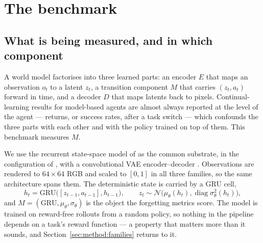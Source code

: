 %
%
%

\section{The benchmark}
\label{sec:method}

\subsection{What is being measured, and in which component}
\label{sec:method:setup}

A world model factorises into three learned parts: an encoder $E$ that maps an
observation $o_t$ to a latent $z_t$, a transition component $M$ that carries
$(z_t, a_t)$ forward in time, and a decoder $D$ that maps latents back to
pixels. Continual-learning results for model-based agents are almost always
reported at the level of the agent --- returns, or success rates, after a task
switch --- which confounds the three parts with each other and with the policy
trained on top of them. This benchmark measures $M$.

We use the recurrent state-space model of \citet{hafner2019planet} as the common
substrate, in the configuration of \citet{hafner2020dreamer}, with a
convolutional VAE encoder--decoder \citep{ha2018worldmodels}. Observations are
rendered to $64 \times 64$ RGB and scaled to $[0,1]$ in all three families, so
the same architecture spans them. The deterministic state is carried by a
GRU cell,
%
\begin{equation}
  h_t = \mathrm{GRU}\big([z_{t-1}, a_{t-1}], h_{t-1}\big),
  \qquad
  z_t \sim \mathcal{N}\big(\mu_\theta(h_t), \operatorname{diag}
  \sigma^2_\theta(h_t)\big),
  \label{eq:rssm}
\end{equation}
%
and $M = (\mathrm{GRU}, \mu_\theta, \sigma_\theta)$ is the object the forgetting
metrics score. The model is trained on reward-free rollouts from a random
policy, so nothing in the pipeline depends on a task's reward function --- a
property that matters more than it sounds, and Section~\ref{sec:method:families}
returns to it.

